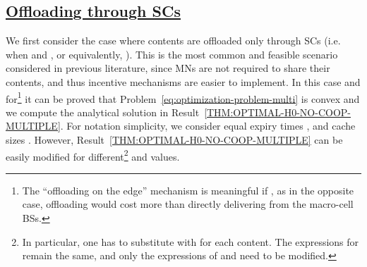 \documentclass[10pt,conference,letterpaper]{IEEEtran}
\begin{document}
\subsection*{\underline{Offloading through SCs}}
We first consider the case where contents are offloaded only through SCs (i.e. when  and , or equivalently, ). This is the most common and feasible scenario considered in previous literature, since MNs are not required to share their contents, and thus incentive mechanisms are easier to implement. In this case and for\footnote{The ``offloading on the edge'' mechanism is meaningful if , as in the opposite case, offloading would cost more than directly delivering from the macro-cell BSs.}  it can be proved that Problem~\ref{eq:optimization-problem-multi} is convex and we compute the analytical solution in Result~\ref{THM:OPTIMAL-H0-NO-COOP-MULTIPLE}. For notation simplicity, we consider equal expiry times , and cache sizes . However, Result~\ref{THM:OPTIMAL-H0-NO-COOP-MULTIPLE} can be easily modified for different\footnote{In particular, one has to substitute  with  for each content. The expressions for  remain the same, and only the expressions of  and  need to be modified.}  and  values.
\end{document}

